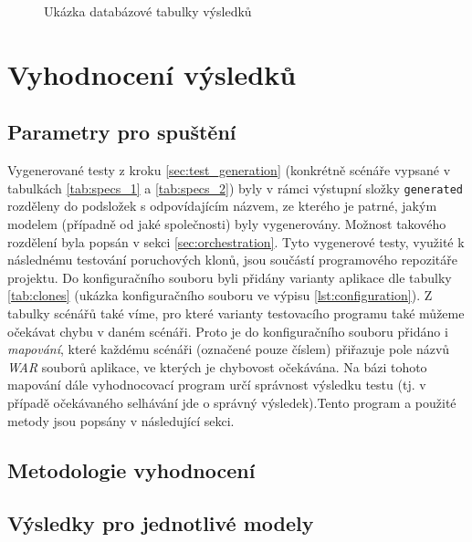 \documentclass[czech, ma, kiv, he, iso690alph, pdf, viewonly]{fasthesis}
\begin{document}
    \begin{figure}
        \centering
        \caption{Ukázka databázové tabulky výsledků}
        \label{fig:sqlite_report}
    \end{figure}


\chapter{Vyhodnocení výsledků}

    \section{Parametry pro spuštění}

    Vygenerované testy z kroku \ref{sec:test_generation} (konkrétně scénáře vypsané v tabulkách \ref{tab:specs_1} a \ref{tab:specs_2}) byly v rámci výstupní složky \verb|generated| rozděleny do podsložek s odpovídajícím názvem, ze kterého je patrné, jakým modelem (případně od jaké společnosti) byly vygenerovány. Možnost takového rozdělení byla popsán v sekci \ref{sec:orchestration}. Tyto vygenerové testy, využité k následnému testování poruchových klonů, jsou součástí programového repozitáře projektu. Do konfiguračního souboru byli přidány varianty aplikace dle tabulky \ref{tab:clones} (ukázka konfiguračního souboru ve výpisu \ref{lst:configuration}). Z tabulky scénářů také víme, pro které varianty testovacího programu také můžeme očekávat chybu v daném scénáři. Proto je do konfiguračního souboru přidáno i \textit{mapování}, které každému scénáři (označené pouze číslem) přiřazuje pole názvů \textit{WAR} souborů aplikace, ve kterých je chybovost očekávána. Na bázi tohoto mapování dále vyhodnocovací program určí správnost výsledku testu (tj. v případě očekávaného selhávání jde o správný výsledek).Tento program a použité metody jsou popsány v následující sekci.

    
    \section{Metodologie vyhodnocení}


    \section{Výsledky pro jednotlivé modely}
    
\end{document}
